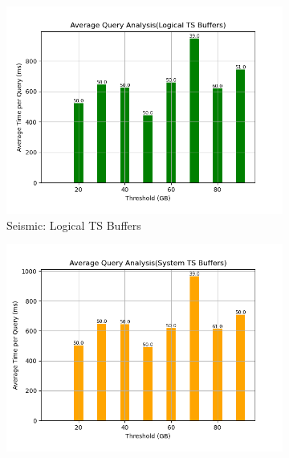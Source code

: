 \begin{figure}
	\centering
	\begin{subfigure}[c]{0.48\textwidth}
		\includegraphics[width=1\textwidth]   {figures/Experiments/Dynamic/SEISMIC/batch_answering/35/average_query_time_per_batch_version_999777015_10485760_10_delay[35].png}
		\caption{Seismic: Logical TS Buffers}
		\label{fig:logical-ts-35-seismic}
	\end{subfigure}
	\begin{subfigure}[c]{0.48\textwidth}
		\includegraphics[width=1\textwidth]	 {figures/Experiments/Dynamic/SEISMIC/batch_answering/35/average_query_time_per_batch_version_999777018_10485760_10_delay[35].png}

\end{subfigure}
\end{figure}
